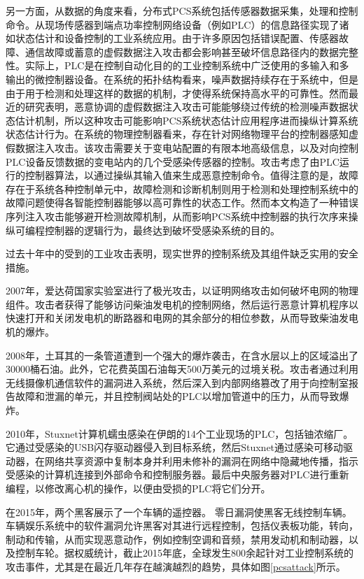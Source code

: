 另一方面，从数据的角度来看，分布式PCS系统包括传感器数据采集，处理和控制命令。从现场传感器到端点功率控制网络设备（例如PLC）的信息路径实现了诸如状态估计和设备控制的工业系统应用。由于许多原因包括错误配置、传感器故障、通信故障或蓄意的虚假数据注入攻击都会影响甚至破坏信息路径内的数据完整性。实际上，PLC是在控制自动化目的的工业控制系统中广泛使用的多输入和多输出的微控制器设备。在系统的拓扑结构看来，噪声数据持续存在于系统中，但是由于用于检测和处理这样的数据的机制，才使得系统保持高水平的可靠性。然而最近的研究\parencite{Liu11,Zonouz12}表明，恶意协调的虚假数据注入攻击可能能够绕过传统的检测噪声数据状态估计机制，所以这种攻击可能影响PCS系统状态估计应用程序进而操纵计算系统状态估计行为\parencite{Liu092,Teixeira12,Xie11}。在系统的物理控制器看来，存在针对网络物理平台的控制器感知虚假数据注入攻击。该攻击需要关于变电站配置的有限本地高级信息，以及对向控制PLC设备反馈数据的变电站内的几个受感染传感器的控制。攻击考虑了由PLC运行的控制器算法，以通过操纵其输入值来生成恶意控制命令。值得注意的是，故障存在于系统各种控制单元中，故障检测和诊断机制则用于检测和处理控制系统中的故障问题使得各智能控制器能够以高可靠性的状态工作。然而本文构造了一种错误序列注入攻击能够避开检测故障机制，从而影响PCS系统中控制器的执行次序来操纵可编程控制器的逻辑行为，最终达到破坏受感染系统的目的。

过去十年中的受到的工业攻击表明，现实世界的控制系统及其组件缺乏实用的安全措施。

2007年，爱达荷国家实验室进行了极光攻击，以证明网络攻击如何破坏电网的物理组件\parencite{Meserve072}。攻击者获得了能够访问柴油发电机的控制网络，然后运行恶意计算机程序以快速打开和关闭发电机的断路器和电网的其余部分的相位参数，从而导致柴油发电机的爆炸。

2008年，土耳其的一条管道遭到一个强大的爆炸袭击，在含水层以上的区域溢出了30000桶石油。此外，它花费英国石油每天500万美元的过境关税。攻击者通过利用无线摄像机通信软件的漏洞进入系统，然后深入到内部网络篡改了用于向控制室报告故障和泄漏的单元，并且控制阀站处的PLC以增加管道中的压力，从而导致爆炸。

2010年，Stuxnet计算机蠕虫感染在伊朗的14个工业现场的PLC，包括铀浓缩厂\parencite{Kushner07,Chen11}。它通过受感染的USB闪存驱动器侵入到目标系统，然后Stuxnet通过感染可移动驱动器，在网络共享资源中复制本身并利用未修补的漏洞在网络中隐藏地传播，指示受感染的计算机连接到外部命令和控制服务器。最后中央服务器对PLC进行重新编程，以修改离心机的操作，以便由受损的PLC将它们分开\parencite{Line14}。

在2015年，两个黑客展示了一个车辆的遥控器\parencite{Miller15}。 零日漏洞使黑客无线控制车辆。车辆娱乐系统中的软件漏洞允许黑客对其进行远程控制，包括仪表板功能，转向，制动和传输，从而实现恶意动作，例如控制空调和音频，禁用发动机和制动器，以及控制车轮\parencite{Thomas15}。据权威统计，截止2015年底，全球发生800余起针对工业控制系统的攻击事件，尤其是在最近几年存在越演越烈的趋势，具体如图\ref{pcsattack}所示。

